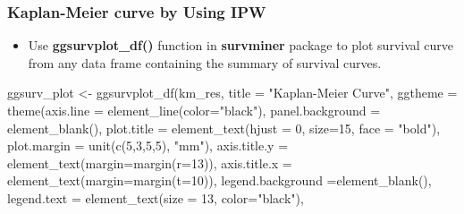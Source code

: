 \documentclass[
]{book}
\newenvironment{Shaded}{\begin{snugshade}}{\end{snugshade}}
\newcommand{\AttributeTok}[1]{\textcolor[rgb]{0.77,0.63,0.00}{#1}}
\newcommand{\DecValTok}[1]{\textcolor[rgb]{0.00,0.00,0.81}{#1}}
\newcommand{\FunctionTok}[1]{\textcolor[rgb]{0.00,0.00,0.00}{#1}}
\newcommand{\NormalTok}[1]{#1}
\newcommand{\OtherTok}[1]{\textcolor[rgb]{0.56,0.35,0.01}{#1}}
\newcommand{\StringTok}[1]{\textcolor[rgb]{0.31,0.60,0.02}{#1}}
\providecommand{\tightlist}{%
  \setlength{\itemsep}{0pt}\setlength{\parskip}{0pt}}
\begin{document}
\hypertarget{kaplan-meier-curve-by-using-ipw}{%
\subsubsection{Kaplan-Meier curve by Using IPW}\label{kaplan-meier-curve-by-using-ipw}}

\begin{itemize}
\tightlist
\item
  Use \textbf{ggsurvplot\_df()} function in \textbf{survminer} package to plot survival curve from any data frame containing the summary of survival curves.
\end{itemize}

\begin{Shaded}
\begin{Highlighting}[]
\NormalTok{ggsurv\_plot }\OtherTok{\textless{}{-}} \FunctionTok{ggsurvplot\_df}\NormalTok{(km\_res,}
                             \AttributeTok{title =} \StringTok{"Kaplan{-}Meier Curve"}\NormalTok{,}
                             \AttributeTok{ggtheme =} \FunctionTok{theme}\NormalTok{(}\AttributeTok{axis.line =} \FunctionTok{element\_line}\NormalTok{(}\AttributeTok{color=}\StringTok{"black"}\NormalTok{),}
                                             \AttributeTok{panel.background =} \FunctionTok{element\_blank}\NormalTok{(),}
                                             \AttributeTok{plot.title =} \FunctionTok{element\_text}\NormalTok{(}\AttributeTok{hjust =} \DecValTok{0}\NormalTok{, }\AttributeTok{size=}\DecValTok{15}\NormalTok{, }\AttributeTok{face =} \StringTok{"bold"}\NormalTok{),}
                                             \AttributeTok{plot.margin =} \FunctionTok{unit}\NormalTok{(}\FunctionTok{c}\NormalTok{(}\DecValTok{5}\NormalTok{,}\DecValTok{3}\NormalTok{,}\DecValTok{5}\NormalTok{,}\DecValTok{5}\NormalTok{), }\StringTok{"mm"}\NormalTok{),}
                                             \AttributeTok{axis.title.y =} \FunctionTok{element\_text}\NormalTok{(}\AttributeTok{margin=}\FunctionTok{margin}\NormalTok{(}\AttributeTok{r=}\DecValTok{13}\NormalTok{)),}
                                             \AttributeTok{axis.title.x =} \FunctionTok{element\_text}\NormalTok{(}\AttributeTok{margin=}\FunctionTok{margin}\NormalTok{(}\AttributeTok{t=}\DecValTok{10}\NormalTok{)),}
                                             \AttributeTok{legend.background =}\FunctionTok{element\_blank}\NormalTok{(),}
                                             \AttributeTok{legend.text =} \FunctionTok{element\_text}\NormalTok{(}\AttributeTok{size =} \DecValTok{13}\NormalTok{, }\AttributeTok{color=}\StringTok{"black"}\NormalTok{),}

\end{Highlighting}
\end{Shaded}
\end{document}
